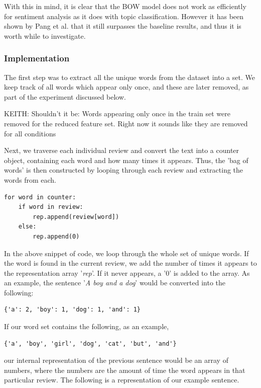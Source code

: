 \documentclass{article}
\begin{document}
With this in mind, it is clear that the BOW model does not work as efficiently for sentiment analysis as it does with topic classification. However it has been shown by Pang et al. \cite{pangetal} that it still surpasses the baseline results, and thus it is worth while to investigate.

\subsubsection{Implementation}

The first step was to extract all the unique words from the dataset into a set. We keep track of all words which appear only once, and these are later removed, as part of the experiment discussed below. 

KEITH: Shouldn't it be: Words appearing only once in the train set were removed for the reduced feature set. Right now it sounds like they are removed for all conditions


Next, we traverse each individual review and convert the text into a counter object, containing each word and how many times it appears. Thus, the 'bag of words' is then constructed by looping through each review and extracting the words from each.

\begin{lstlisting}
for word in counter:
	if word in review:
		rep.append(review[word])
	else:
		rep.append(0)
\end{lstlisting}

In the above snippet of code, we loop through the whole set of unique words. If the word is found in the current review, we add the number of times it appears to the representation array '\textit{rep}'. If it never appears, a '0' is added to the array. As an example, the sentence '\textit{A boy and a dog}' would be converted into the following:

\begin{lstlisting}
{'a': 2, 'boy': 1, 'dog': 1, 'and': 1}
\end{lstlisting}

If our word set contains the following, as an example,
\begin{lstlisting}
{'a', 'boy', 'girl', 'dog', 'cat', 'but', 'and'}
\end{lstlisting}

our internal representation of the previous sentence would be an array of numbers, where the numbers are the amount of time the word appears in that particular review. The following is a representation of our example sentence.
\end{document}
